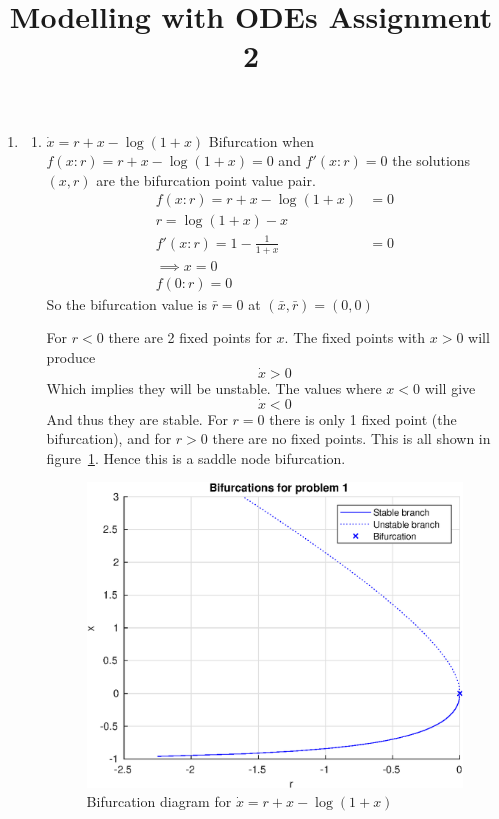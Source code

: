 \documentclass{/home/janmebows/Documents/LatexTemplates/myassignment}
\title{Modelling with ODEs Assignment 2}
\begin{document}
\maketitle
\begin{enumerate}
    \item 
    \begin{enumerate}
        \item $\dot x = r + x - \log (1+x)$
        Bifurcation when $f(x:r) = r+x-\log(1+x) = 0$ and $f'(x:r) = 0$ the solutions $(x,r)$ are the bifurcation point value pair.
        \begin{align*}
            f(x:r) = r+ x - \log(1+x) &= 0\\
            r = \log(1+x) - x\\
            f'(x:r) = 1 - \frac1{1+x} &=0\\
            \implies x = 0\\
            f(0:r) = 0
        \end{align*}
        So the bifurcation value is $\bar{r} = 0$ at $(\bar{x},\bar{r}) = (0,0)$
       
        For $r<0$ there are 2 fixed points for $x$. The fixed points with $x >0$ will produce 
        \[\dot x > 0\]
        Which implies they will be unstable. The values where $x < 0$ will give
        \[\dot x < 0\]
        And thus they are stable.
        For $r =0$ there is only 1 fixed point (the bifurcation), and for $r >0$ there are no fixed points.
        This is all shown in figure~\ref{fig:q1a}. Hence this is a saddle node bifurcation.


         \begin{figure}[H]
             \centering
             \label{fig:q1a}
             \includegraphics{ODEsA2Q1a.eps}
             \caption{Bifurcation diagram for $\dot x = r + x - \log (1+x)$}
         \end{figure}


\end{enumerate}
\end{enumerate}
\end{document}
